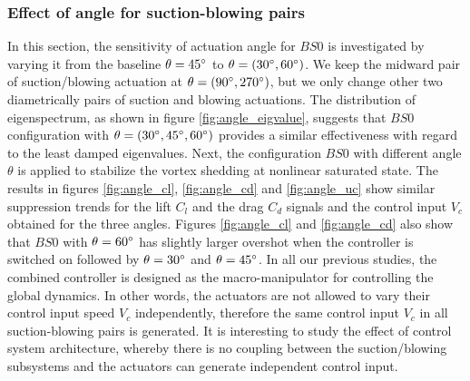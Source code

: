 \documentclass[standard]{jfm}
\begin{document}
\subsubsection{Effect of angle for suction-blowing pairs}\label{sec:angle}
In this section, the sensitivity of actuation angle for $BS0$ is investigated 
by varying it from the baseline $\theta=45 \degree$ to $\theta=(30 \degree, 60 \degree)$. 
%
We keep the midward pair of suction/blowing actuation at 
$\theta=(90 \degree, 270 \degree)$, but we only 
change other two diametrically pairs of suction and blowing actuations.
%
The distribution of eigenspectrum, as shown in figure \ref{fig:angle_eigvalue}, suggests 
that $BS0$ configuration with $\theta=(30 \degree,45 \degree,60 \degree)$
provides a similar effectiveness with regard to the least damped eigenvalues. 
Next, the configuration $BS0$ with different angle $\theta$ is applied 
to stabilize the vortex 
shedding at nonlinear saturated state. 
The results in figures \ref{fig:angle_cl}, \ref{fig:angle_cd} and \ref{fig:angle_uc} 
show similar suppression trends for the lift $C_l$ and the drag $C_d$ signals and 
the control input $V_c$ obtained for the three angles. 
Figures \ref{fig:angle_cl} and \ref{fig:angle_cd} also show that $BS0$ with $\theta=60 \degree$ 
has slightly larger overshot when the controller is switched on 
followed by $\theta=30 \degree$ and $\theta=45 \degree$. 
%
In all our previous studies, 
the combined controller is designed as the macro-manipulator for controlling 
the global dynamics. In other words, the actuators are not allowed to vary their 
control input speed $V_c$ independently, therefore the same control input $V_c$ 
in all suction-blowing pairs is generated. 
%
It is interesting to study the effect of control system architecture, whereby 
there is no coupling between the suction/blowing subsystems and the actuators 
can generate independent control input.
%
\end{document}
